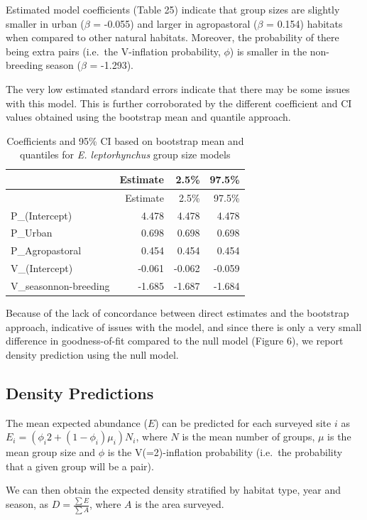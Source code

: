 \documentclass[]{article}
\begin{document}
Estimated model coefficients (Table 25) indicate that group sizes are
slightly smaller in urban (\(\beta\) = -0.055) and larger in
agropastoral (\(\beta\) = 0.154) habitats when compared to other natural
habitats. Moreover, the probability of there being extra pairs (i.e.~the
V-inflation probability, \(\phi\)) is smaller in the non-breeding season
(\(\beta\) = -1.293).

The very low estimated standard errors indicate that there may be some
issues with this model. This is further corroborated by the different
coefficient and CI values obtained using the bootstrap mean and quantile
approach.

\begin{longtable}[]{@{}lrrr@{}}
\caption{Coefficients and 95\% CI based on bootstrap mean and quantiles
for \textit{E. leptorhynchus} group size models}\tabularnewline
\toprule
& Estimate & 2.5\% & 97.5\%\tabularnewline
\midrule
\endfirsthead
\toprule
& Estimate & 2.5\% & 97.5\%\tabularnewline
\midrule
\endhead
P\_(Intercept) & 4.478 & 4.478 & 4.478\tabularnewline
P\_Urban & 0.698 & 0.698 & 0.698\tabularnewline
P\_Agropastoral & 0.454 & 0.454 & 0.454\tabularnewline
V\_(Intercept) & -0.061 & -0.062 & -0.059\tabularnewline
V\_seasonnon-breeding & -1.685 & -1.687 & -1.684\tabularnewline
\bottomrule
\end{longtable}

Because of the lack of concordance between direct estimates and the
bootstrap approach, indicative of issues with the model, and since there
is only a very small difference in goodness-of-fit compared to the null
model (Figure 6), we report density prediction using the null model.

\subsection{Density Predictions}\label{density-predictions-1}

The mean expected abundance (\(E\)) can be predicted for each surveyed
site \(i\) as \(E_{i} = (\phi_{i} 2 + (1 - \phi_{i})\mu_{i})N_{i}\),
where \(N\) is the mean number of groups, \(\mu\) is the mean group size
and \(\phi\) is the V(=2)-inflation probability (i.e.~the probability
that a given group will be a pair).

We can then obtain the expected density stratified by habitat type, year
and season, as \(D = \frac{\sum E}{\sum A}\), where \(A\) is the area
surveyed.
\end{document}
